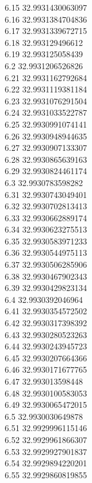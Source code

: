 {6.15	32.9931430063097\\
6.16	32.9931384704836\\
6.17	32.9931339672715\\
6.18	32.993129496612\\
6.19	32.993125058439\\
6.2	32.9931206526826\\
6.21	32.9931162792684\\
6.22	32.9931119381184\\
6.23	32.9931076291504\\
6.24	32.9931033522787\\
6.25	32.9930991074141\\
6.26	32.9930948944635\\
6.27	32.9930907133307\\
6.28	32.9930865639163\\
6.29	32.9930824461174\\
6.3	32.9930783598282\\
6.31	32.9930743049401\\
6.32	32.9930702813413\\
6.33	32.9930662889174\\
6.34	32.9930623275513\\
6.35	32.9930583971233\\
6.36	32.9930544975113\\
6.37	32.9930506285906\\
6.38	32.9930467902343\\
6.39	32.9930429823134\\
6.4	32.9930392046964\\
6.41	32.9930354572502\\
6.42	32.9930317398392\\
6.43	32.9930280523263\\
6.44	32.9930243945723\\
6.45	32.9930207664366\\
6.46	32.9930171677765\\
6.47	32.993013598448\\
6.48	32.9930100583053\\
6.49	32.9930065472015\\
6.5	32.9930030649878\\
6.51	32.9929996115146\\
6.52	32.9929961866307\\
6.53	32.9929927901837\\
6.54	32.9929894220201\\
6.55	32.9929860819855\\
}
